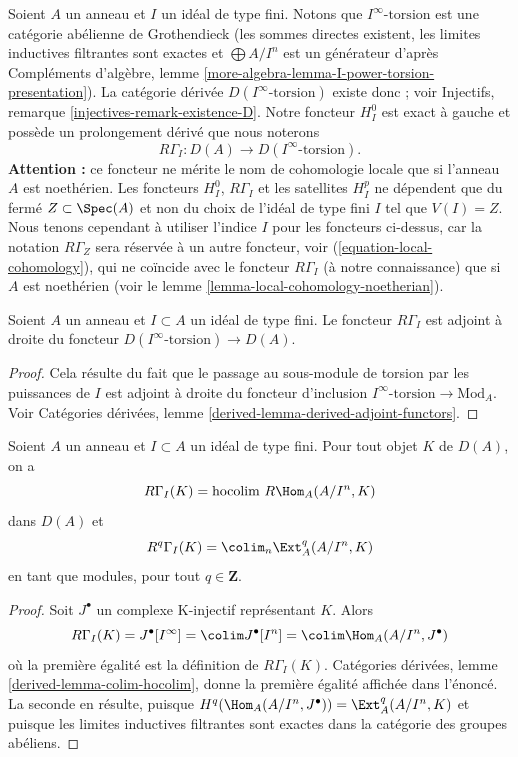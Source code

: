 \medskip\noindent
Soient $A$ un anneau et $I$ un idéal de type fini.
Notons que $I^\infty\text{-torsion}$ est une catégorie abélienne de Grothendieck
(les sommes directes existent, les limites inductives filtrantes sont
exactes et $\bigoplus A/I^n$ est un générateur d'après
Compléments d'algèbre, lemme \ref{more-algebra-lemma-I-power-torsion-presentation}).
La catégorie dérivée $D(I^\infty\text{-torsion})$ existe donc ; voir Injectifs, remarque \ref{injectives-remark-existence-D}.
Notre foncteur $H^0_I$ est exact à gauche et possède un prolongement dérivé
que nous noterons
$$
R\Gamma_I : D(A) \longrightarrow D(I^\infty\text{-torsion}).
$$
{\bf Attention :} ce foncteur ne mérite le nom de cohomologie
locale que si l'anneau $A$ est noethérien.
Les foncteurs $H^0_I$, $R\Gamma_I$ et les satellites $H^p_I$
ne dépendent que du fermé $Z \subset \Spec(A)$ et non du choix de l'idéal
de type fini $I$ tel que $V(I) = Z$.
Nous tenons cependant à utiliser l'indice $I$ pour les foncteurs
ci-dessus, car la notation $R\Gamma_Z$ sera réservée à un autre foncteur,
voir (\ref{equation-local-cohomology}), qui ne coïncide avec le foncteur $R\Gamma_I$
(à notre connaissance) que si $A$ est noethérien
(voir le lemme \ref{lemma-local-cohomology-noetherian}).

\begin{lemma}
\label{lemma-adjoint}
Soient $A$ un anneau et $I \subset A$ un idéal de type fini.
Le foncteur $R\Gamma_I$ est adjoint à droite du foncteur
$D(I^\infty\text{-torsion}) \to D(A)$.
\end{lemma}

\begin{proof}
Cela résulte du fait que le passage au sous-module de torsion
par les puissances de $I$ est adjoint à droite du foncteur d'inclusion
$I^\infty\text{-torsion} \to \text{Mod}_A$. Voir Catégories dérivées, lemme \ref{derived-lemma-derived-adjoint-functors}.
\end{proof}

\begin{lemma}
\label{lemma-local-cohomology-ext}
Soient $A$ un anneau et $I \subset A$ un idéal de type fini.
Pour tout objet $K$ de $D(A)$, on a
$$
R\Gamma_I(K) = \text{hocolim}\ R\Hom_A(A/I^n, K)
$$
dans $D(A)$ et
$$
R^q\Gamma_I(K) = \colim_n \Ext_A^q(A/I^n, K)
$$
en tant que modules, pour tout $q \in \mathbf{Z}$.
\end{lemma}

\begin{proof}
Soit $J^\bullet$ un complexe K-injectif représentant $K$. Alors
$$
R\Gamma_I(K) = J^\bullet[I^\infty] = \colim J^\bullet[I^n] =
\colim \Hom_A(A/I^n, J^\bullet)
$$
où la première égalité est la définition de $R\Gamma_I(K)$.
Catégories dérivées, lemme \ref{derived-lemma-colim-hocolim}, donne la première égalité
affichée dans l'énoncé. La seconde en résulte, puisque $H^q(\Hom_A(A/I^n, J^\bullet)) = \Ext^q_A(A/I^n, K)$
et puisque les limites inductives filtrantes sont exactes
dans la catégorie des groupes abéliens.
\end{proof}

